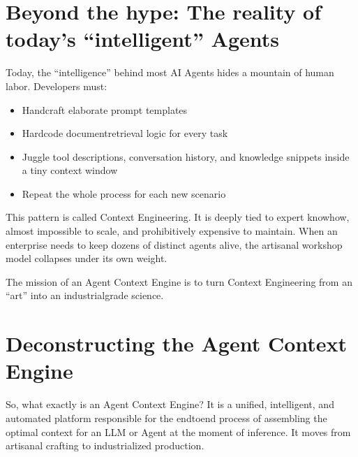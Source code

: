 \documentclass[letterpaper,10pt,english]{sphinxmanual}
\begin{document}
\section{Beyond the hype: The reality of today’s “intelligent” Agents}
\label{\detokenize{agent-context-engine:beyond-the-hype-the-reality-of-today-s-intelligent-agents}}
\sphinxAtStartPar
Today, the “intelligence” behind most AI Agents hides a mountain of human labor. Developers must:
\begin{itemize}
\item {} 
\sphinxAtStartPar
Hand\sphinxhyphen{}craft elaborate prompt templates

\item {} 
\sphinxAtStartPar
Hard\sphinxhyphen{}code document\sphinxhyphen{}retrieval logic for every task

\item {} 
\sphinxAtStartPar
Juggle tool descriptions, conversation history, and knowledge snippets inside a tiny context window

\item {} 
\sphinxAtStartPar
Repeat the whole process for each new scenario

\end{itemize}

\sphinxAtStartPar
This pattern is called Context Engineering. It is deeply tied to expert know\sphinxhyphen{}how, almost impossible to scale, and prohibitively expensive to maintain. When an enterprise needs to keep dozens of distinct agents alive, the artisanal workshop model collapses under its own weight.

\sphinxAtStartPar
The mission of an Agent Context Engine is to turn Context Engineering from an “art” into an industrial\sphinxhyphen{}grade science.


\section{Deconstructing the Agent Context Engine}
\label{\detokenize{agent-context-engine:deconstructing-the-agent-context-engine}}
\sphinxAtStartPar
So, what exactly is an Agent Context Engine? It is a unified, intelligent, and automated platform responsible for the end\sphinxhyphen{}to\sphinxhyphen{}end process of assembling the optimal context for an LLM or Agent at the moment of inference. It moves from artisanal crafting to industrialized production.
\end{document}
